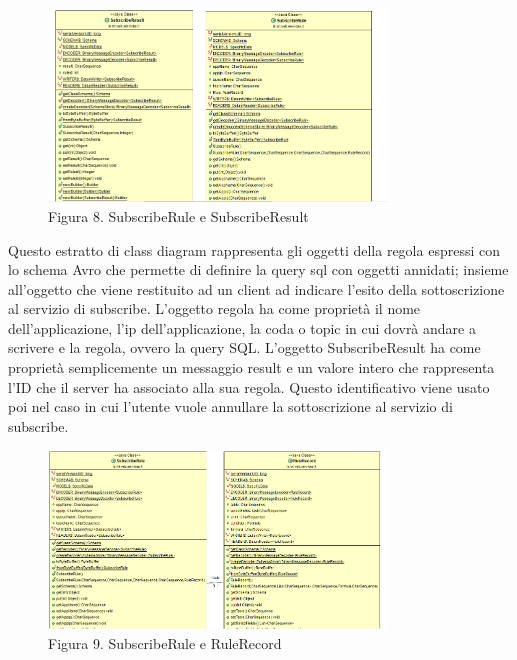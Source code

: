 \clearpage
\begin{figure}[h]
	\centering
	\includegraphics[width=0.8\textwidth]{subscribe-result.png}
	\caption*{Figura 8. SubscribeRule e SubscribeResult}
\end{figure}
Questo estratto di class diagram rappresenta gli oggetti della regola espressi con lo schema Avro che permette di definire la query sql con oggetti annidati; insieme all’oggetto che viene restituito ad un client ad indicare l’esito della sottoscrizione al servizio di subscribe. L’oggetto regola ha come proprietà il nome dell’applicazione, l’ip dell’applicazione, la coda o topic in cui dovrà andare a scrivere e la regola, ovvero la query SQL. L’oggetto SubscribeResult ha come proprietà semplicemente un messaggio result e un valore intero che rappresenta l’ID che il server ha associato alla sua regola. Questo identificativo viene usato poi nel caso in cui l’utente vuole annullare la sottoscrizione al servizio di subscribe.
\par \vspace*{2em}
\begin{figure}[h]
	\centering
	\includegraphics[width=0.8\textwidth]{rule-record.png}
	\caption*{Figura 9. SubscribeRule e RuleRecord}
\end{figure}

